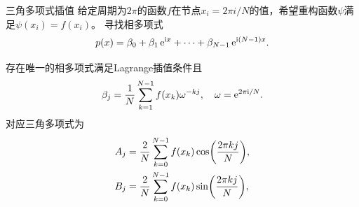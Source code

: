 \begin{definition}
    {三角多项式插值}{}
    给定周期为$2\pi$的函数$f$在节点$x_i=2\pi i/N$的值，希望重构函数$\psi$满足$\psi(x_i)=f(x_i)$。
    \tcblower
    寻找相多项式
    \begin{equation}
        p(x)=\beta_0+\beta_1\mathop{}\!\mathrm{e}^{\mathrm{i} x}+\cdots+\beta_{N-1}\mathop{}\!\mathrm{e}^{\mathrm{i}(N-1)x}.
    \end{equation}
\end{definition}

\begin{theorem}
    {}{}
    存在唯一的相多项式满足Lagrange插值条件且
    \begin{equation}
        \beta_j=\frac1N\sum_{k=1}^{N-1}f(x_k)\omega^{-kj},\quad\omega=\mathop{}\!\mathrm{e}^{2\pi\mathrm{i}/N}.
    \end{equation}
    对应三角多项式为
    \begin{subequations}
        \begin{align}
            A_j&=\frac2N\sum_{k=0}^{N-1}f(x_k)\cos\biggl(\frac{2\pi kj}N\biggr),\\
            B_j&=\frac2N\sum_{k=0}^{N-1}f(x_k)\sin\biggl(\frac{2\pi kj}N\biggr),
        \end{align}
    \end{subequations}
\end{theorem}



